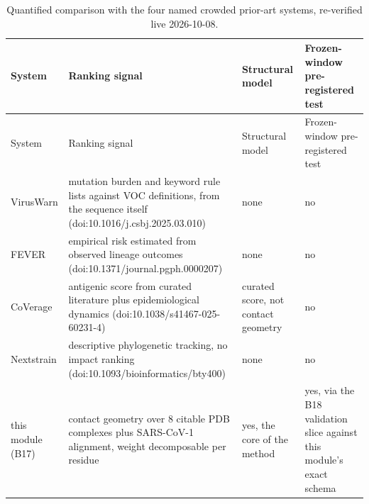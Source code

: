 \begin{longtable}{p{2.4cm}p{5.6cm}p{2.6cm}p{2.6cm}}
\caption{Quantified comparison with the four named crowded prior-art systems, re-verified live 2026-10-08.}\label{tab:priorart}\\
\toprule System & Ranking signal & Structural model & Frozen-window pre-registered test\\\midrule\endfirsthead
\toprule System & Ranking signal & Structural model & Frozen-window pre-registered test\\\midrule\endhead
\bottomrule\endlastfoot
VirusWarn & mutation burden and keyword rule lists against VOC definitions, from the sequence itself (doi:10.1016/j.csbj.2025.03.010) & none & no\\
FEVER & empirical risk estimated from observed lineage outcomes (doi:10.1371/journal.pgph.0000207) & none & no\\
CoVerage & antigenic score from curated literature plus epidemiological dynamics (doi:10.1038/s41467-025-60231-4) & curated score, not contact geometry & no\\
Nextstrain & descriptive phylogenetic tracking, no impact ranking (doi:10.1093/bioinformatics/bty400) & none & no\\
this module (B17) & contact geometry over 8 citable PDB complexes plus SARS-CoV-1 alignment, weight decomposable per residue & yes, the core of the method & yes, via the B18 validation slice against this module's exact schema\\
\end{longtable}
